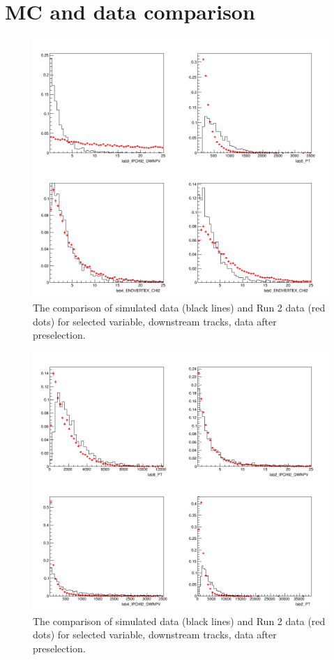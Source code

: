 \newpage
\section{MC and data comparison}

\begin{figure}[ht]
\includegraphics[width=11.5cm]{figs/MC_Data_Comp/DD0_0.png}
\centering
\caption{The comparison of simulated data (black lines) and Run 2 data (red dots) for selected variable, downstream tracks, data after preselection.}
\label{fig:MC_Data_Comp_DD0_0}
\end{figure}


\begin{figure}[hb]
\includegraphics[width=11.5cm]{figs/MC_Data_Comp/DD0_1.png}
\centering
\caption{The comparison of simulated data (black lines) and Run 2 data (red dots) for selected variable, downstream tracks, data after preselection.}
\label{fig:MC_Data_Comp_DD0_1}
\end{figure}


